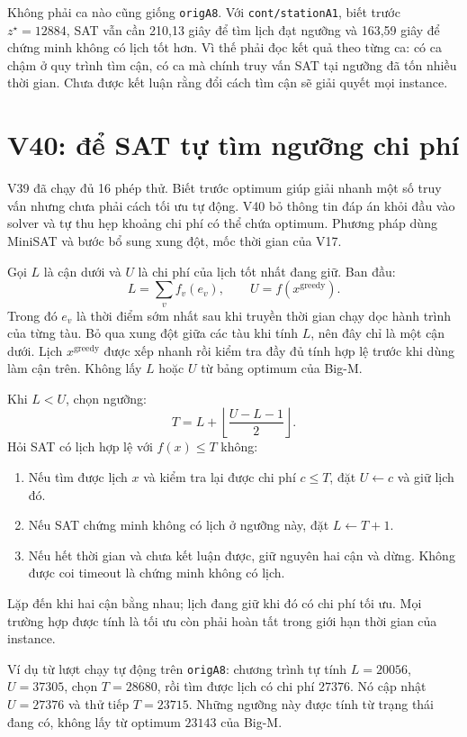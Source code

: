 \documentclass[11pt,a4paper]{article}
\newcommand{\code}[1]{\texttt{#1}}
\begin{document}
Không phải ca nào cũng giống \code{origA8}. Với \code{cont/stationA1},
biết trước $z^\star=12884$, SAT vẫn cần 210,13 giây để tìm lịch đạt ngưỡng
và 163,59 giây để chứng minh không có lịch tốt hơn. Vì thế phải đọc kết
quả theo từng ca: có ca chậm ở quy trình tìm cận, có ca mà chính truy vấn
SAT tại ngưỡng đã tốn nhiều thời gian. Chưa được kết luận rằng đổi cách
tìm cận sẽ giải quyết mọi instance.

\section{V40: để SAT tự tìm ngưỡng chi phí}

V39 đã chạy đủ 16 phép thử. Biết trước optimum giúp giải nhanh một số
truy vấn nhưng chưa phải cách tối ưu tự động. V40 bỏ thông tin đáp án
khỏi đầu vào solver và tự thu hẹp khoảng chi phí có thể chứa optimum.
Phương pháp dùng MiniSAT và bước bổ sung xung đột, mốc thời gian của V17.

Gọi $L$ là cận dưới và $U$ là chi phí của lịch tốt nhất đang giữ. Ban đầu:
\[
 L=\sum_v f_v(e_v),\qquad U=f(x^{\mathrm{greedy}}).
\]
Trong đó $e_v$ là thời điểm sớm nhất sau khi truyền thời gian chạy dọc
hành trình của từng tàu. Bỏ qua xung đột giữa các tàu khi tính $L$, nên
đây chỉ là một cận dưới. Lịch $x^{\mathrm{greedy}}$ được xếp nhanh rồi
kiểm tra đầy đủ tính hợp lệ trước khi dùng làm cận trên. Không lấy $L$
hoặc $U$ từ bảng optimum của Big-M.

Khi $L<U$, chọn ngưỡng:
\[
 T=L+\left\lfloor\frac{U-L-1}{2}\right\rfloor.
\]
Hỏi SAT có lịch hợp lệ với $f(x)\le T$ không:
\begin{enumerate}
\item Nếu tìm được lịch $x$ và kiểm tra lại được chi phí $c\le T$,
      đặt $U\leftarrow c$ và giữ lịch đó.
\item Nếu SAT chứng minh không có lịch ở ngưỡng này, đặt
      $L\leftarrow T+1$.
\item Nếu hết thời gian và chưa kết luận được, giữ nguyên hai cận và
      dừng. Không được coi timeout là chứng minh không có lịch.
\end{enumerate}
Lặp đến khi hai cận bằng nhau; lịch đang giữ khi đó có chi phí tối ưu.
Mọi trường hợp được tính là tối ưu còn phải hoàn tất trong giới hạn
thời gian của instance.

Ví dụ từ lượt chạy tự động trên \code{origA8}: chương trình tự tính
$L=20056$, $U=37305$, chọn $T=28680$, rồi tìm được lịch có chi phí
$27376$. Nó cập nhật $U=27376$ và thử tiếp $T=23715$. Những ngưỡng này
được tính từ trạng thái đang có, không lấy từ optimum $23143$ của Big-M.
\end{document}
